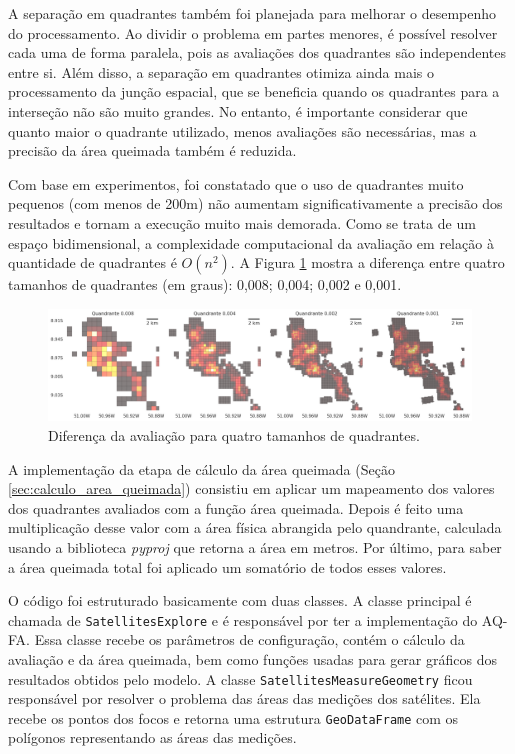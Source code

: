 \documentclass[cic,tc]{iiufrgs}
\begin{document}
A separação em quadrantes também foi planejada para melhorar o desempenho do processamento. Ao dividir o problema em partes menores, é possível resolver cada uma de forma paralela, pois as avaliações dos quadrantes são independentes entre si. Além disso, a separação em quadrantes otimiza ainda mais o processamento da junção espacial, que se beneficia quando os quadrantes para a interseção não são muito grandes. No entanto, é importante considerar que quanto maior o quadrante utilizado, menos avaliações são necessárias, mas a precisão da área queimada também é reduzida.

Com base em experimentos, foi constatado que o uso de quadrantes muito pequenos (com menos de 200m) não aumentam significativamente a precisão dos resultados e tornam a execução muito mais demorada. Como se trata de um espaço bidimensional, a complexidade computacional da avaliação em relação à quantidade de quadrantes é $O(n^2)$. A Figura \ref{fig:diferenca_entre_quadrantes} mostra a diferença entre quatro tamanhos de quadrantes (em graus): 0,008; 0,004; 0,002 e 0,001.

\begin{figure}[!htb]
    \caption{Diferença da avaliação para quatro tamanhos de quadrantes.}
    \begin{center}
        \includegraphics[width=35em]{diferenca_entre_quadrantes}
    \end{center}
    \label{fig:diferenca_entre_quadrantes}
\end{figure}

A implementação da etapa de cálculo da área queimada (Seção \ref{sec:calculo_area_queimada}) consistiu em aplicar um mapeamento dos valores dos quadrantes avaliados com a função área queimada. Depois é feito uma multiplicação desse valor com a área física abrangida pelo quandrante, calculada usando a biblioteca \textit{pyproj} que retorna a área em metros. Por último, para saber a área queimada total foi aplicado um somatório de todos esses valores.

O código foi estruturado basicamente com duas classes. A classe principal é chamada de \texttt{SatellitesExplore} e é responsável por ter a implementação do AQ-FA. Essa classe recebe os parâmetros de configuração, contém o cálculo da avaliação e da área queimada, bem como funções usadas para gerar gráficos dos resultados obtidos pelo modelo. A classe \texttt{SatellitesMeasureGeometry} ficou responsável por resolver o problema das áreas das medições dos satélites. Ela recebe os pontos dos focos e retorna uma estrutura \texttt{GeoDataFrame} com os polígonos representando as áreas das medições.
\end{document}
